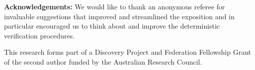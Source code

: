 \bigskip\noindent
{\bf Acknowledgements:}\quad 
We would like to thank an anonymous referee for invaluable
suggestions that improved and streamlined the exposition and in particular encouraged us to think about and improve
the deterministic verification procedures.
%

This research forms part of a Discovery
Project and Federation Fellowship Grant of the  second author funded by the
Australian Research Council.%

%
%

%
